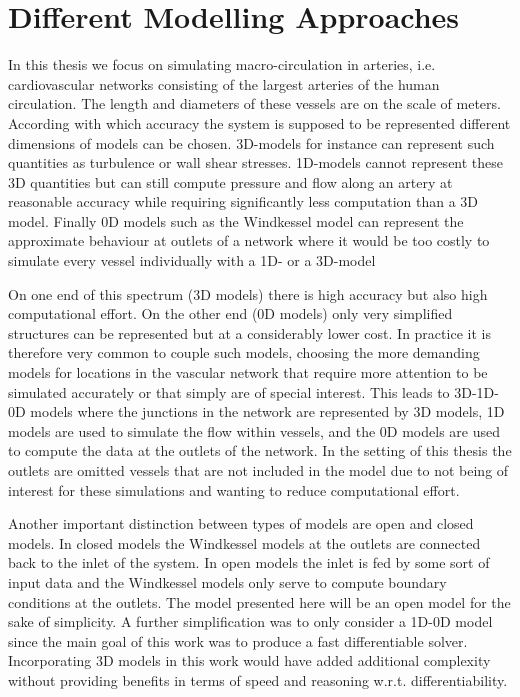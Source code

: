 \documentclass[a4paper, oneside]{discothesis}
\begin{document}
\section{Different Modelling Approaches} \label{sec:ma}
In this thesis we focus on simulating macro-circulation in arteries, i.e. cardiovascular networks consisting of the largest arteries of the human circulation.
The length and diameters of these vessels are on the scale of meters.
According with which accuracy the system is supposed to be represented different dimensions of models can be chosen.
3D-models for instance can represent such quantities as turbulence or wall shear stresses.
1D-models cannot represent these 3D quantities but can still compute pressure and flow along an artery at reasonable accuracy while requiring significantly less computation than a 3D model.
Finally 0D models such as the Windkessel model can represent the approximate behaviour at outlets of a network where it would be too costly to simulate every vessel individually with a 1D- or a 3D-model

On one end of this spectrum (3D models) there is high accuracy but also high computational effort.
On the other end (0D models) only very simplified structures can be represented but at a considerably lower cost.
In practice it is therefore very common to couple such models, choosing the more demanding models for locations in the vascular network that require more attention to be simulated accurately or that simply are of special interest.
This leads to 3D-1D-0D models where the junctions in the network are represented by 3D models, 1D models are used to simulate the flow within vessels, and the 0D models are used to compute the data at the outlets of the network.
In the setting of this thesis the outlets are omitted vessels that are not included in the model due to not being of interest for these simulations and wanting to reduce computational effort.

Another important distinction between types of models are open and closed models.
In closed models the Windkessel models at the outlets are connected back to the inlet of the system.
In open models the inlet is fed by some sort of input data and the Windkessel models only serve to compute boundary conditions at the outlets.
The model presented here will be an open model for the sake of simplicity.
A further simplification was to only consider a 1D-0D model since the main goal of this work was to produce a fast differentiable solver.
Incorporating 3D models in this work would have added additional complexity without providing benefits in terms of speed and reasoning w.r.t. differentiability. \cite{köppl2023dimension}
\end{document}
